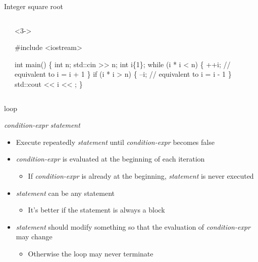 \begin{frame}[fragile]{Integer square root}
\begin{columns}[T]
\begin{column}{.5\textwidth}
    \end{column}

    \begin{column}{.5\textwidth}
      \begin{codeblock}<3->{
#include <iostream>

int main()
\{
  int n;
  std::cin >> n;
  int i\{1\};
  while (i * i < n) \{
    ++i;   // equivalent to i = i + 1
  \}
  if (i * i > n) \{
    --i;   // equivalent to i = i - 1
  \}
  std::cout << i << \bslashn;
\}}\end{codeblock}
    \end{column}

  \end{columns}

\end{frame}

\begin{frame}[fragile]{ loop}

  \begin{center}
     \textit{condition-expr} \code{)} \textit{statement}
  \end{center}

  \pause

  \begin{itemize}[<+->]
  \item Execute repeatedly \textit{statement} until \textit{condition-expr}
    becomes false
  \item \textit{condition-expr} is evaluated at the beginning of each iteration
    \begin{itemize}
    \item If \textit{condition-expr} is already  at the beginning,
      \textit{statement} is never executed
    \end{itemize}
  \item \textit{statement} can be any statement
    \begin{itemize}
    \item It's better if the statement is always a block
    \end{itemize}
  \item \textit{statement} should modify something so that the evaluation of
    \textit{condition-expr} may change
    \begin{itemize}[<.->]
    \item Otherwise the loop may never terminate
    \end{itemize}
  \end{itemize}

\end{frame}

